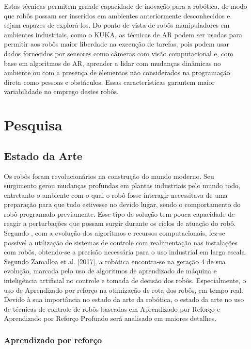 \documentclass[]{politex}
\begin{document}
	Estas técnicas permitem grande capacidade de inovação para a robótica, de modo que robôs possam ser inseridos em ambientes anteriormente desconhecidos e sejam capazes de explorá-los. Do ponto de vista de robôs manipuladores em ambientes industriais, como o KUKA, as técnicas de AR podem ser usadas para permitir aos robôs maior liberdade na execução de tarefas, pois podem usar dados fornecidos por sensores como câmeras com visão computacional e, com base em algoritmos de AR, aprender a lidar com mudanças dinâmicas no ambiente ou com a presença de elementos não considerados na programação direta como pessoas e obstáculos. Essas características garantem maior variabilidade no emprego destes robôs.
	
\part{Pesquisa}
\chapter{Estado da Arte}

    	Os robôs foram revolucionários na construção do mundo moderno. Seu surgimento gerou mudanças profundas em plantas industriais pelo mundo todo, entretanto o ambiente com o qual o robô fosse interagir necessitava de uma preparação para que tudo estivesse no devido lugar, sendo o comportamento do robô programado previamente. Esse tipo de solução tem pouca capacidade de reagir a perturbações que possam surgir durante os ciclos de atuação do robô. Segundo \cite{Zhu2021}, com a evolução dos algoritmos e recursos computacionais, fez-se possível a utilização de sistemas de controle com realimentação nas instalações com robôs, obtendo-se a precisão necessária para o uso industrial em larga escala. Segundo Zamalloa et al. [2017], a robótica encontra-se na geração 4 de sua evolução, marcada pelo uso de algoritmos de aprendizado de máquina e inteligência artificial no controle e tomada de decisão dos robôs. Especialmente, o uso de Aprendizado por reforço na otimização de rota dos robôs, em tempo real.
    	Devido à sua importância no estado da arte da robótica, o estado da arte no uso de técnicas de controle de robôs baseadas em Aprendizado por Reforço e Aprendizado por Reforço Profundo será analisado em maiores detalhes.
    	
    	
    	\section{Aprendizado por reforço}
    	
\end{document}

